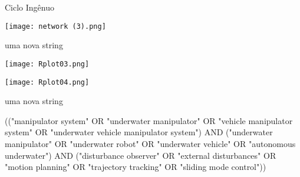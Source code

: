 \begin{frame}[t]{Ciclo Ingênuo}
    

    \centering
    \centerline{\texttt{[image: network (3).png]}}

\end{frame}
\begin{frame}[t]{uma nova string}
    
    \centering
    \centerline{\texttt{[image: Rplot03.png]}}

    \centering
    \centerline{\texttt{[image: Rplot04.png]}}


\end{frame}
\begin{frame}[c]{uma nova string}
    
    \begin{tcolorbox}[colback=gcolor!5!white,colframe=gcolor!75!black,title=String Refinada]
        (("manipulator system" OR "underwater manipulator" OR "vehicle manipulator system" OR "underwater vehicle manipulator system") AND ("underwater manipulator" OR "underwater robot" OR "underwater vehicle" OR "autonomous underwater") AND ("disturbance observer" OR "external disturbances" OR "motion planning" OR "trajectory tracking" OR "sliding mode control"))
    \end{tcolorbox}

    
\end{frame}
